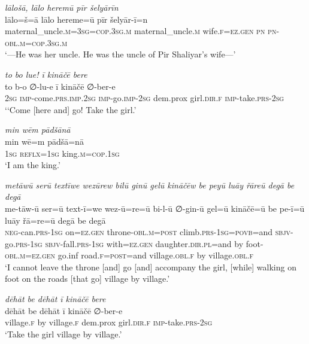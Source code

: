 \ea \label{ŽP.158}
\textit{lālošā, lālo heremū pīr šelyārīn} \\ 
\gll lālo=š=ā lālo hereme=ū pīr šelyār-ī=n \\ 
 maternal\_uncle\textsc{.m}\textsc{=3sg}\textsc{=cop}\textsc{.3sg}\textsc{.m} maternal\_uncle\textsc{.m} wife\textsc{.f}\textsc{\textsc{=ez.gen}} \textsc{pn} \textsc{pn}\textsc{-obl}\textsc{.m}\textsc{=cop}\textsc{.3sg}\textsc{.m} \\ 
\glt `—He was her uncle. He was the uncle of Pir Shaliyar’s wife—'
\z 
 
\ea \label{ŽP.159}
\textit{to bo lue! ī kināčē bere} \\ 
\gll to b-o ∅-lu-e ī kināčē ∅-ber-e \\ 
 \textsc{2sg} \textsc{imp-}come\textsc{.prs}\textsc{.imp}\textsc{.\textsc{2sg}} \textsc{imp-}go.\textsc{imp-}\textsc{2sg} dem.prox girl\textsc{.dir}\textsc{.f} \textsc{imp-}take\textsc{.prs}-\textsc{2sg} \\ 
\glt `‘Come [here and] go! Take the girl.'
\z 
 
\ea \label{ŽP.160}
\textit{min wēm pādšānā} \\ 
\gll min wē=m pādšā=nā \\ 
 \textsc{1sg} \textsc{reflx}\textsc{=\textsc{1sg}} king\textsc{.m}\textsc{=cop}\textsc{.\textsc{1sg}} \\ 
\glt `I am the king.'
\z 
 
\ea \label{ŽP.161}
\textit{metāwū serū textīwe wezūrew bilū ginū gelū kināčēw be peyū luāy řāreū degā be degā} \\ 
\gll me-tāw-ū ser=ū text-ī=we wez-ū=re=ū bi-l-ū ∅-gin-ū gel=ū kināčē=ū be pe-ī=ū luāy řā=re=ū degā be degā \\ 
 \textsc{neg-}can\textsc{.prs}\textsc{-\textsc{1sg}} on\textsc{\textsc{=ez.gen}} throne\textsc{-obl}\textsc{.m}\textsc{=\textsc{post}} climb\textsc{.prs}\textsc{-\textsc{1sg}}\textsc{=\textsc{povb}}=and \textsc{sbjv-}go\textsc{.prs}\textsc{-\textsc{1sg}} \textsc{sbjv-}fall\textsc{.prs}\textsc{-\textsc{1sg}} with\textsc{\textsc{=ez.gen}} daughter\textsc{.dir}\textsc{.pl}=and by foot\textsc{-obl}\textsc{.m}\textsc{\textsc{=ez.gen}} go.inf road\textsc{.f}\textsc{=\textsc{post}}=and village\textsc{.obl}\textsc{.f} by village\textsc{.obl}\textsc{.f} \\ 
\glt `I cannot leave the throne [and] go [and] accompany the girl, [while] walking on foot on the roads [that go] village by village.'
\z 
 
\ea \label{ŽP.162}
\textit{dēhāt be dēhāt ī kināčē bere} \\ 
\gll dēhāt be dēhāt ī kināčē ∅-ber-e \\ 
 village\textsc{.f} by village\textsc{.f} dem.prox girl\textsc{.dir}\textsc{.f} \textsc{imp-}take\textsc{.prs}-\textsc{2sg} \\ 
\glt `Take the girl village by village.'
\z 
 
